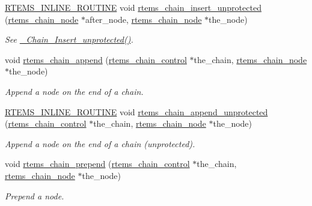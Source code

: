 \begin{DoxyCompactItemize}
\mbox{\label{group__ClassicChains_ga05a0b6fe053a6a97d95a4112e3b43eaf}} 
\mbox{\hyperlink{group__RTEMSScoreBaseDefs_gac216239df231d5dbd15e3520b0b9313f}{R\+T\+E\+M\+S\+\_\+\+I\+N\+L\+I\+N\+E\+\_\+\+R\+O\+U\+T\+I\+NE}} void \mbox{\hyperlink{group__ClassicChains_ga05a0b6fe053a6a97d95a4112e3b43eaf}{rtems\+\_\+chain\+\_\+insert\+\_\+unprotected}} (\mbox{\hyperlink{structChain__Node__struct}{rtems\+\_\+chain\+\_\+node}} $\ast$after\+\_\+node, \mbox{\hyperlink{structChain__Node__struct}{rtems\+\_\+chain\+\_\+node}} $\ast$the\+\_\+node)
\begin{DoxyCompactList}\small\item\em See \mbox{\hyperlink{group__RTEMSScoreChain_ga0ac64438b8eb6f4dfd182bc3885cea42}{\+\_\+\+Chain\+\_\+\+Insert\+\_\+unprotected()}}. \end{DoxyCompactList}\item 
void \mbox{\hyperlink{group__ClassicChains_ga946ee16c96fcf84a071a5bc951f1eaaa}{rtems\+\_\+chain\+\_\+append}} (\mbox{\hyperlink{unionChain__Control}{rtems\+\_\+chain\+\_\+control}} $\ast$the\+\_\+chain, \mbox{\hyperlink{structChain__Node__struct}{rtems\+\_\+chain\+\_\+node}} $\ast$the\+\_\+node)
\begin{DoxyCompactList}\small\item\em Append a node on the end of a chain. \end{DoxyCompactList}\item 
\mbox{\hyperlink{group__RTEMSScoreBaseDefs_gac216239df231d5dbd15e3520b0b9313f}{R\+T\+E\+M\+S\+\_\+\+I\+N\+L\+I\+N\+E\+\_\+\+R\+O\+U\+T\+I\+NE}} void \mbox{\hyperlink{group__ClassicChains_ga8f97f792051585d8bd91d0ca0d302f96}{rtems\+\_\+chain\+\_\+append\+\_\+unprotected}} (\mbox{\hyperlink{unionChain__Control}{rtems\+\_\+chain\+\_\+control}} $\ast$the\+\_\+chain, \mbox{\hyperlink{structChain__Node__struct}{rtems\+\_\+chain\+\_\+node}} $\ast$the\+\_\+node)
\begin{DoxyCompactList}\small\item\em Append a node on the end of a chain (unprotected). \end{DoxyCompactList}\item 
void \mbox{\hyperlink{group__ClassicChains_ga361b3475492fb0bd0a56ee80440367c7}{rtems\+\_\+chain\+\_\+prepend}} (\mbox{\hyperlink{unionChain__Control}{rtems\+\_\+chain\+\_\+control}} $\ast$the\+\_\+chain, \mbox{\hyperlink{structChain__Node__struct}{rtems\+\_\+chain\+\_\+node}} $\ast$the\+\_\+node)
\begin{DoxyCompactList}\small\item\em Prepend a node. \end{DoxyCompactList}\item 

\end{DoxyCompactItemize}
